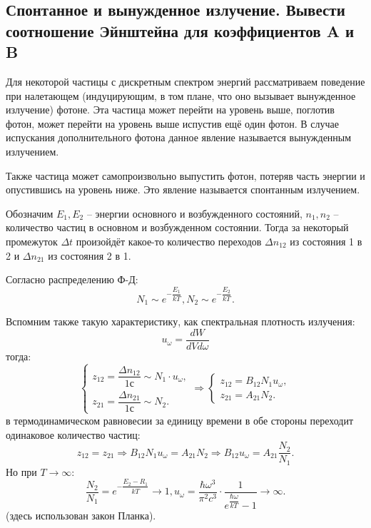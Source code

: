 \subsection{Спонтанное и вынужденное излучение. Вывести соотношение Эйнштейна для
коэффициентов A и B}

Для некоторой частицы с дискретным спектром энергий рассматриваем поведение при налетающем
(индуцирующим, в том плане, что оно вызывает вынужденное излучение) фотоне. Эта частица может
перейти на уровень выше, поглотив фотон, может перейти на уровень выше испустив ещё один фотон.
В случае испускания дополнительного фотона данное явление называется вынужденным излучением.

Также частица может самопроизвольно выпустить фотон, потеряв часть энергии и опустившись на
уровень ниже. Это явление называется спонтанным излучением.

Обозначим $E_1, E_2$ -- энергии основного и возбужденного состояний, $n_1, n_2$ -- количество
частиц в основном и возбужденном состоянии. Тогда за некоторый промежуток $\Delta t$ произойдёт
какое-то количество переходов $\Delta n_{12}$ из состояния 1 в 2 и $\Delta n_{21}$ из
состояния 2 в 1.

Согласно распределению Ф-Д:
\[
  N_1 \sim e^{-\dfrac{E_1}{kT}}, N_2 \sim e^{-\dfrac{E_2}{kT}}.
\]

Вспомним также такую характеристику, как спектральная плотность излучения:
\[
  u_\omega = \dfrac{dW}{dV d\omega}
\]
тогда:
\[
  \begin{cases}
    z_{12} = \dfrac{\Delta n_{12}}{1 с} \sim N_1 \cdot u_\omega, \\
    z_{21} = \dfrac{\Delta n_{21}}{1 с} \sim N_2. 
  \end{cases}
  \Rightarrow
  \begin{cases}
    z_{12} = B_{12} N_1 u_\omega, \\
    z_{21} = A_{21} N_2.
  \end{cases}
\]
в термодинамическом равновесии за единицу времени в обе стороны переходит одинаковое количество 
частиц:
\[
  z_{12} = z_{21} \Rightarrow
  B_{12} N_1 u_\omega = A_{21} N_2
  \Rightarrow
  B_{12} u_\omega = A_{21} \dfrac{N_2}{N_1}.
\]
Но при $T \to \infty$:
\[
  \dfrac{N_2}{N_1} = e^{- \dfrac{E_2-R_1}{kT}} \to 1,
  u_\omega = \dfrac{\hbar \omega^3}{\pi^2 c^3} \cdot \dfrac{1}{e^{\dfrac{\hbar \omega}{kT}} - 1} \to \infty.
\]
(здесь использован закон Планка).

